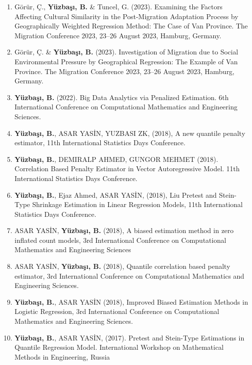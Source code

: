 \documentclass[10pt,letterpaper]{article}
\newenvironment{etaremune}{\begin{enumerate}}{\end{enumerate}}
\begin{document}
\begin{etaremune}
\item Görür, Ç., {\bf Y\"{u}zba\c{s}{\i}, B.} \& Tuncel, G. (2023). Examining the Factors Affecting Cultural Similarity in the Post-Migration Adaptation Process by Geographically Weighted Regression Method: The Case of Van Province. The Migration Conference 2023, 23--26 August 2023, Hamburg, Germany.
\item Görür, Ç. \& {\bf Y\"{u}zba\c{s}{\i}, B.} (2023). Investigation of Migration due to Social Environmental Pressure by Geographical Regression: The Example of Van Province. The Migration Conference 2023, 23--26 August 2023, Hamburg, Germany.

\item  {\bf Y\"{u}zba\c{s}{\i}, B.} (2022). Big Data Analytics via Penalized Estimation. 6th International Conference on Computational Mathematics and Engineering Sciences.

\item  {\bf Y\"{u}zba\c{s}{\i}, B.}, ASAR YASİN, YUZBASI ZK, (2018), A new quantile penalty estimator, 11th International Statistics Days Conference. 

\item  {\bf Y\"{u}zba\c{s}{\i}, B.}, DEMIRALP AHMED, GUNGOR MEHMET (2018).  Correlation Based Penalty Estimator in Vector Autoregressive Model.  11th International Statistics Days Conference.

\item  {\bf Y\"{u}zba\c{s}{\i}, B.}, Ejaz Ahmed, ASAR YASİN, (2018), Liu Pretest and Stein-Type Shrinkage Estimation in Linear Regression Models, 11th International Statistics Days Conference. 

\item  ASAR YASİN, {\bf Y\"{u}zba\c{s}{\i}, B.} (2018), A biased estimation method in zero inflated count models, 3rd International Conference on Computational Mathematics and Engineering Sciences

\item  ASAR YASİN, {\bf Y\"{u}zba\c{s}{\i}, B.} (2018), Quantile correlation based penalty estimator, 3rd International Conference on Computational Mathematics and Engineering Sciences. 

\item  {\bf Y\"{u}zba\c{s}{\i}, B.}, ASAR YASİN (2018), Improved Biased Estimation Methods in Logistic Regression, 3rd International Conference on Computational Mathematics and Engineering Sciences.

\item  {\bf Y\"{u}zba\c{s}{\i}, B.}, ASAR YASİN, (2017).  Pretest and Stein-Type Estimations in Quantile Regression Model. International Workshop on Mathematical Methods in Engineering, Russia


\end{etaremune}
\end{document}
